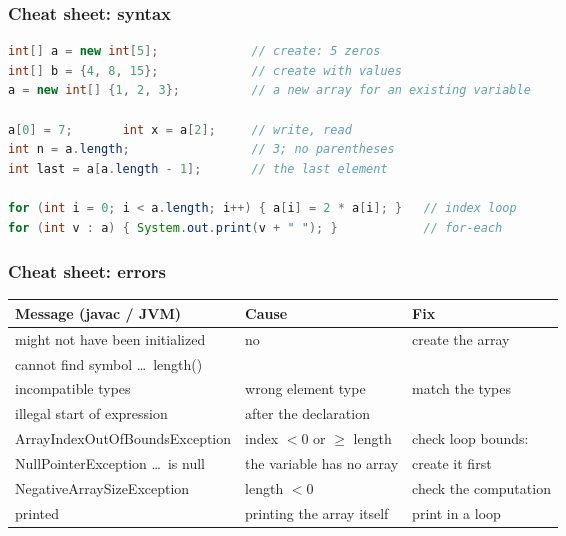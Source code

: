 \documentclass[aspectratio=169,10pt,compress]{beamer}
\begin{document}
\begin{frame}[t,fragile] \frametitle{Cheat sheet: syntax}


\begin{lstlisting}[style=codesnippet, language=Java]
int[] a = new int[5];             // create: 5 zeros
int[] b = {4, 8, 15};             // create with values
a = new int[] {1, 2, 3};          // a new array for an existing variable

a[0] = 7;       int x = a[2];     // write, read
int n = a.length;                 // 3; no parentheses
int last = a[a.length - 1];       // the last element

for (int i = 0; i < a.length; i++) { a[i] = 2 * a[i]; }   // index loop
for (int v : a) { System.out.print(v + " "); }            // for-each
\end{lstlisting}


\end{frame}




\begin{frame}[t,fragile] \frametitle{Cheat sheet: errors}


\begin{table}
		\footnotesize
		\begin{tabular}{@{}L{0.40\textwidth}L{0.26\textwidth}L{0.26\textwidth}@{}}
			\toprule
			\textbf{Message (javac / JVM)} & \textbf{Cause} & \textbf{Fix} \\
			\midrule
			might not have been initialized          & no             & create the array \\
			cannot find symbol \dots\ length()       &           &  \\
			incompatible types                       & wrong element type        & match the types \\
			illegal start of expression              & \hCode{\{\dots\}} after the declaration &  \\
			\midrule
			ArrayIndexOutOfBoundsException           & index $< 0$ or $\ge$ length & check loop bounds: \hCode{<} \\
			NullPointerException \dots\ is null      & the variable has no array & create it first \\
			NegativeArraySizeException               & length $< 0$              & check the computation \\
			\hCode{[I@\dots} printed                 & printing the array itself & print in a loop \\
			\bottomrule
		\end{tabular}
\end{table}%


\end{frame}
\end{document}

